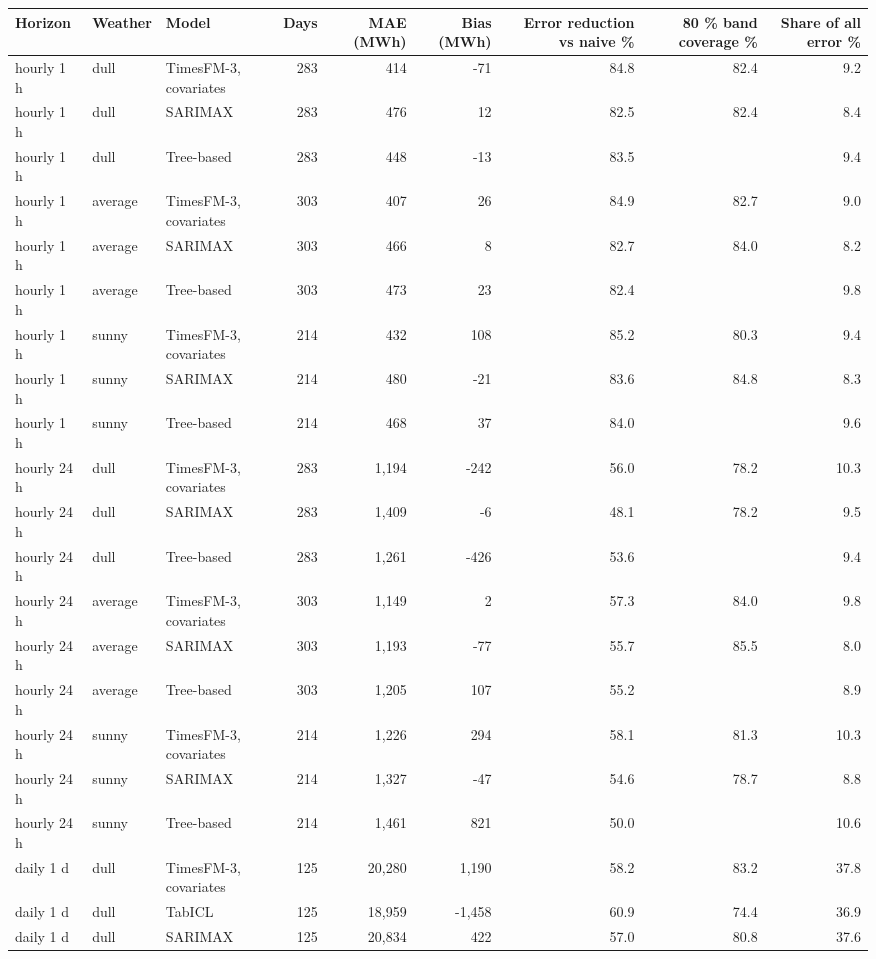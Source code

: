 \begin{tabular}{lllrrrrrr}
\toprule
Horizon & Weather & Model & Days & MAE (MWh) & Bias (MWh) & Error reduction vs naive \% & 80 \% band coverage \% & Share of all error \% \\
\midrule
hourly 1 h & dull & TimesFM-3, covariates & 283 & 414 & -71 & 84.8 & 82.4 & 9.2 \\
hourly 1 h & dull & SARIMAX & 283 & 476 & 12 & 82.5 & 82.4 & 8.4 \\
hourly 1 h & dull & Tree-based & 283 & 448 & -13 & 83.5 &  & 9.4 \\
hourly 1 h & average & TimesFM-3, covariates & 303 & 407 & 26 & 84.9 & 82.7 & 9.0 \\
hourly 1 h & average & SARIMAX & 303 & 466 & 8 & 82.7 & 84.0 & 8.2 \\
hourly 1 h & average & Tree-based & 303 & 473 & 23 & 82.4 &  & 9.8 \\
hourly 1 h & sunny & TimesFM-3, covariates & 214 & 432 & 108 & 85.2 & 80.3 & 9.4 \\
hourly 1 h & sunny & SARIMAX & 214 & 480 & -21 & 83.6 & 84.8 & 8.3 \\
hourly 1 h & sunny & Tree-based & 214 & 468 & 37 & 84.0 &  & 9.6 \\
hourly 24 h & dull & TimesFM-3, covariates & 283 & 1,194 & -242 & 56.0 & 78.2 & 10.3 \\
hourly 24 h & dull & SARIMAX & 283 & 1,409 & -6 & 48.1 & 78.2 & 9.5 \\
hourly 24 h & dull & Tree-based & 283 & 1,261 & -426 & 53.6 &  & 9.4 \\
hourly 24 h & average & TimesFM-3, covariates & 303 & 1,149 & 2 & 57.3 & 84.0 & 9.8 \\
hourly 24 h & average & SARIMAX & 303 & 1,193 & -77 & 55.7 & 85.5 & 8.0 \\
hourly 24 h & average & Tree-based & 303 & 1,205 & 107 & 55.2 &  & 8.9 \\
hourly 24 h & sunny & TimesFM-3, covariates & 214 & 1,226 & 294 & 58.1 & 81.3 & 10.3 \\
hourly 24 h & sunny & SARIMAX & 214 & 1,327 & -47 & 54.6 & 78.7 & 8.8 \\
hourly 24 h & sunny & Tree-based & 214 & 1,461 & 821 & 50.0 &  & 10.6 \\
daily 1 d & dull & TimesFM-3, covariates & 125 & 20,280 & 1,190 & 58.2 & 83.2 & 37.8 \\
daily 1 d & dull & TabICL & 125 & 18,959 & -1,458 & 60.9 & 74.4 & 36.9 \\
daily 1 d & dull & SARIMAX & 125 & 20,834 & 422 & 57.0 & 80.8 & 37.6 \\

\end{tabular}
